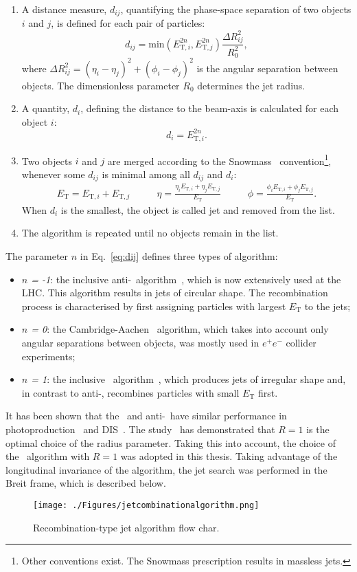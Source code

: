 \begin{enumerate}
	\item A distance measure, $d_{ij}$, quantifying the phase-space separation of two objects $i$ and $j$, is defined for each pair of particles:
	\begin{equation}
	  d_{ij} = \mathrm{\text{min}} \left( E_{\text{T},i}^{2n}, E_{\text{T},j}^{2n} \right) \dfrac{\Delta R_{ij}^2}{R_0^2},
		\label{eq:dij}
	\end{equation}
	where $\Delta R_{ij}^2 = \left( \eta_{i} - \eta_{j} \right)^2 + \left( \phi_{i} - \phi_{j} \right)^2$ is the angular separation between objects. The dimensionless parameter $R_0$ determines the jet radius.
	\item A quantity, $d_i$, defining the distance to the beam-axis is calculated for each object $i$:
		\begin{equation}
	  d_{i} = E_{\text{T},i}^{2n}.
		\label{eq:di}
	\end{equation}
	\item Two objects $i$ and $j$ are merged according to the Snowmass~\cite{proc:snowmass:1990:134} convention\footnote{Other conventions exist. The Snowmass prescription results in massless jets.}, whenever some $d_{ij}$ is minimal among all $d_{ij}$ and $d_{i}$:
	\begin{align}
		E_\text{T} = E_{\text{T},i} + E_{\text{T},j} & \qquad \eta = \frac{\eta_iE_{\text{T},i} + \eta_jE_{\text{T},j}}{E_\text{T}} & \qquad \phi = \frac{\phi_iE_{\text{T},i} + \phi_jE_{\text{T},j}}{E_\text{T}}.			 \label{eq:snowmass}
	\end{align}
	When $d_i$ is the smallest, the object is called jet and removed from the list.
	\item The algorithm is repeated until no objects remain in the list.
\end{enumerate}
The parameter $n$ in Eq.~\eqref{eq:dij} defines three types of algorithm:
\begin{itemize}
	\item \textsl{$n$ = -1}: the inclusive anti-\kt~algorithm~\cite{Cacciari:2008gp}, which is now extensively used at the LHC. This algorithm results in jets of circular shape. The recombination process is characterised by first assigning particles with largest $E_\text{T}$ to the jets;
	\item \textsl{$n$ = 0}: the Cambridge-Aachen~\cite{Dokshitzer:1997in} algorithm, which takes into account only angular separations between objects, was mostly used in $e^+e^-$ collider experiments;
	\item \textsl{$n$ = 1}: the inclusive \kt~algorithm~\cite{Catani:1993hr}, which produces jets of irregular shape and, in contrast to anti-\kt, recombines particles with small $E_\text{T}$ first.
\end{itemize}
 It has been shown that the \kt~and anti-\kt~have similar performance in photoproduction~\cite{np:b864:1} and DIS~\cite{Abramowicz:2010ke}. The study~\cite{pl:b649:12} has demonstrated that $R=1$ is the optimal choice of the radius parameter. Taking this into account, the choice of the \kt~algorithm with $R=1$ was adopted in this thesis. Taking advantage of the longitudinal invariance of the algorithm, the jet search was performed in the Breit frame, which is described below.

\begin{figure}
	\centering
		\texttt{[image: ./Figures/jetcombinationalgorithm.png]}
	\caption{Recombination-type jet algorithm flow char.}
	\label{fig:jetcombinationalgorithm}
\end{figure}
